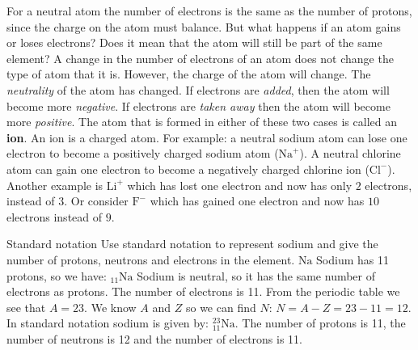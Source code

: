 \label{m38745*eip-950} 
      \noindent 
\label{m38745*eip-222}For a neutral atom the number of electrons is the same as the number of protons, since the charge on the atom must balance. But what happens if an atom gains or loses electrons? Does it mean that the atom will still be part of the same element? A change in the number of electrons of an atom does not change the type of atom that it is. However, the charge of the atom will change. The \textsl{neutrality} of the atom has changed. If electrons are \textsl{added}, then the atom will become more \textsl{negative}. If electrons are \textsl{taken away} then the atom will become more \textsl{positive}. The atom that is formed in either of these two cases is called an \textbf{ion}. An ion is a charged atom. For example: a neutral sodium atom can lose one electron to become a positively charged sodium atom ($\text{Na}^{+}$). A neutral chlorine atom can gain one electron to become a negatively charged chlorine ion ($\text{Cl}^{-}$). Another example is $\text{Li}^{+}$ which has lost one electron and now has only $2$ electrons, instead of $3$. Or consider $\text{F}^{-}$ which has gained one electron and now has $10$ electrons instead of $9$.   
\begin{wex}
{%
Standard notation
}
{%
Use standard notation to represent sodium and give the number of protons, neutrons and electrons in the element.
}
{%
 $\text{Na}$
 Sodium has 11 protons, so we have: ${}_{11}\text{Na}$
 Sodium is neutral, so it has the same number of electrons as protons. The number of electrons is 11.
 From the periodic table we see that $A=23$.
 We know $A$ and $Z$ so we can find $N$: $N = A - Z = 23 - 11 = 12$.
 In standard notation sodium is given by: $_{11}^{23}\text{Na}$. The number of protons is 11, the number of neutrons is 12 and the number of electrons is 11.
}    
\end{wex}
    

